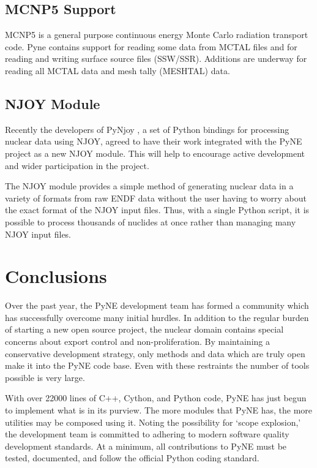 \documentclass{anstrans}
\begin{document}
\subsection{MCNP5 Support}
MCNP5 \cite{mcnp} is a general purpose continuous energy Monte Carlo
radiation transport code.  Pyne contains support for reading some data
from MCTAL files and for reading and writing surface source files
(SSW/SSR).  Additions are underway for reading all MCTAL data and mesh
tally (MESHTAL) data.

\subsection{NJOY Module}
Recently the developers of PyNjoy \cite{dragon}, a set of Python bindings for processing
nuclear data using NJOY, agreed to have their work integrated with the PyNE
project as a new NJOY module. This will help to encourage active development and
wider participation in the project.

The NJOY module provides a simple method of generating nuclear data in a variety
of formats from raw ENDF data without the user having to worry about the exact
format of the NJOY input files. Thus, with a single Python script, it is
possible to process thousands of nuclides at once rather than managing
many NJOY input files.


\section{Conclusions}
Over the past year, the PyNE development team has formed a community 
which has successfully overcome many initial hurdles.  In addition to
the regular burden of starting a new open source project, the nuclear 
domain contains special concerns about export control and non-proliferation.
By maintaining a conservative development strategy, only methods and data
which are truly open make it into the PyNE code base.  Even with these 
restraints the number of tools possible is very large.

With over 22000 lines of C++, Cython, and Python code, PyNE has just begun to
implement what is in its purview.  The more modules that PyNE has, the more
utilities may be composed using it.   Noting the possibility for 
`scope explosion,' the development team is committed to adhering to 
modern software quality development standards.  At a minimum, all contributions 
to PyNE must be tested, documented, and follow the official Python coding
standard.
\end{document}
